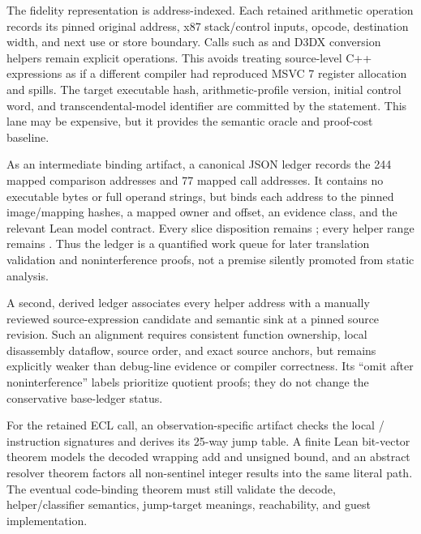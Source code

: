 The fidelity representation is address-indexed.  Each retained arithmetic
operation records its pinned original address, x87 stack/control inputs,
opcode, destination width, and next use or store boundary.  Calls such as
 and D3DX conversion helpers remain explicit operations.  This
avoids treating source-level C++ expressions as if a different compiler had
reproduced MSVC 7 register allocation and spills.  The target executable hash,
arithmetic-profile version, initial control word, and transcendental-model
identifier are committed by the statement.  This lane may be expensive, but
it provides the semantic oracle and proof-cost baseline.

As an intermediate binding artifact, a canonical JSON ledger records the 244
mapped comparison addresses and 77 mapped  call addresses.  It
contains no executable bytes or full operand strings, but binds each address
to the pinned image/mapping hashes, a mapped owner and offset, an evidence
class, and the relevant Lean model contract.  Every slice disposition remains
; every helper range remains .  Thus the
ledger is a quantified work queue for later translation validation and
noninterference proofs, not a premise silently promoted from static analysis.

A second, derived ledger associates every helper address with a manually
reviewed source-expression candidate and semantic sink at a pinned source
revision.  Such an alignment requires consistent function ownership, local
disassembly dataflow, source order, and exact source anchors, but remains
explicitly weaker than debug-line evidence or compiler correctness.  Its
``omit after noninterference'' labels prioritize quotient proofs; they do not
change the conservative base-ledger status.

For the retained ECL call, an observation-specific artifact checks the local
/ instruction signatures and derives its 25-way
jump table.  A finite Lean bit-vector theorem models the decoded wrapping add
and unsigned bound, and an abstract resolver theorem factors all non-sentinel
integer results into the same literal path.  The eventual code-binding theorem
must still validate the decode, helper/classifier semantics, jump-target
meanings, reachability, and guest implementation.

